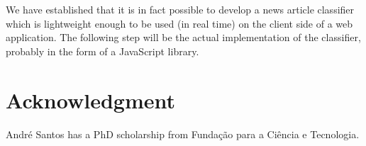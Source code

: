 \documentclass[runningheads,a4paper]{llncs}[2015/06/24]
\begin{document}
We have established that it is in fact possible
to develop a news article classifier which is lightweight enough to be
used (in real time) on the client side of a web application. The
following step will be the actual implementation of the classifier,
probably in the form of a JavaScript library.


\section*{Acknowledgment}

André Santos has a PhD scholarship from Fundação para a Ciência e
Tecnologia.




\end{document}
